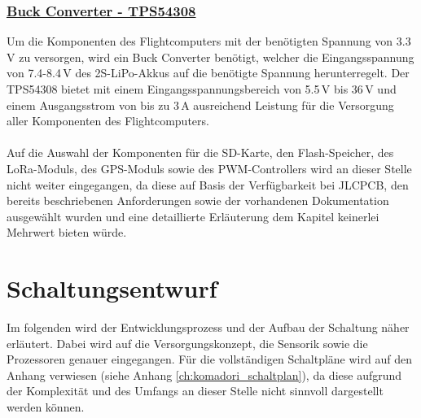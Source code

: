 \subsubsection{\href{https://www.ti.com/product/TPS54308}{Buck Converter - TPS54308}}
Um die Komponenten des Flightcomputers mit der benötigten Spannung von 3.3\,V zu versorgen, wird ein Buck Converter benötigt, welcher die Eingangsspannung von 7.4-8.4\,V des 2S-LiPo-Akkus auf die benötigte Spannung herunterregelt. Der TPS54308 bietet mit einem Eingangsspannungsbereich von 5.5\,V bis 36\,V und einem Ausgangsstrom von bis zu 3\,A ausreichend Leistung für die Versorgung aller Komponenten des Flightcomputers. 
\\
\\
Auf die Auswahl der Komponenten für die SD-Karte, den Flash-Speicher, des LoRa-Moduls, des GPS-Moduls sowie des PWM-Controllers wird an dieser Stelle nicht weiter eingegangen, da diese auf Basis der Verfügbarkeit bei JLCPCB, den bereits beschriebenen Anforderungen sowie der vorhandenen Dokumentation ausgewählt wurden und eine detaillierte Erläuterung dem Kapitel keinerlei Mehrwert bieten würde.
 
\section{Schaltungsentwurf}
\label{sec:schaltungsentwurf}
Im folgenden wird der Entwicklungsprozess und der Aufbau der Schaltung näher erläutert. Dabei wird auf die Versorgungskonzept, die Sensorik sowie die Prozessoren genauer eingegangen. Für die vollständigen Schaltpläne wird auf den Anhang verwiesen (siehe Anhang \ref{ch:komadori_schaltplan}), da diese aufgrund der Komplexität und des Umfangs an dieser Stelle nicht sinnvoll dargestellt werden können.


